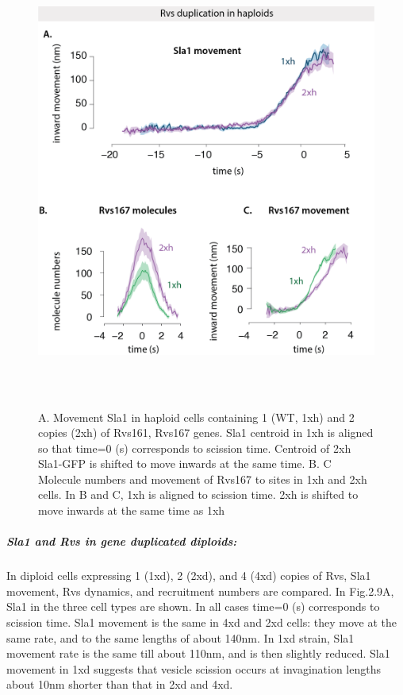 				\begin{figure}[H]
				\centering
				\includegraphics[width=15cm,height=15cm,keepaspectratio]{figures/results_final/rvs_haploid3}
				\vspace*{2mm}
				\caption[Overexpression of Rvs in haploid cells]
					{A. Movement Sla1 in haploid cells containing 1 (WT, 1xh) and 2 copies (2xh) of Rvs161, Rvs167 genes. Sla1 centroid in 1xh is aligned so that time=0 (s) corresponds to scission time. Centroid of 2xh Sla1-GFP is shifted to move inwards at the same time. 
					B. C Molecule numbers and movement of Rvs167 to sites in 1xh and 2xh cells. In B and C, 1xh is aligned to scission time. 2xh is shifted to move inwards at the same time as 1xh
			 \label{fig_rvshaploid}}

				\end{figure}
		

		
		\subparagraph{Sla1 and Rvs in gene duplicated diploids:}

In diploid cells expressing 1 (1xd), 2 (2xd), and 4 (4xd) copies of Rvs, Sla1 movement, Rvs dynamics, and recruitment numbers are compared. 
In Fig.2.9A, Sla1 in the three cell types are shown. In all cases time=0 (s) corresponds to scission time. Sla1 movement is the same in 4xd and 2xd cells: they move at the same rate, and to the same lengths of about 140nm. In 1xd strain, Sla1 movement rate is the same till about 110nm, and is then slightly reduced. Sla1 movement in 1xd suggests that vesicle scission occurs at invagination lengths about 10nm shorter than that in 2xd and 4xd. 

